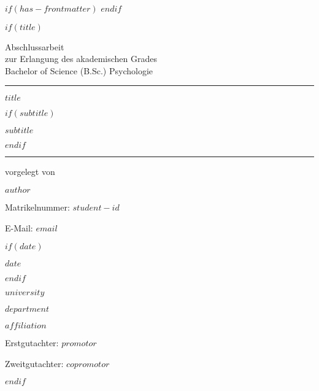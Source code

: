 $if(has-frontmatter)$
\frontmatter
$endif$

$if(title)$
\thispagestyle{empty}
{\centering
Abschlussarbeit \\
zur Erlangung des akademischen Grades \\
Bachelor of Science (B.Sc.) Psychologie \\
\vspace*{10mm}
\hrule
\vspace*{15mm}
{\large\bfseries $title$ \par}
$if(subtitle)$
{\large\bfseries $subtitle$ \par}
$endif$

\vspace*{15mm}
\hrule
\vspace*{10mm}
vorgelegt von  \\ 
{\large\bfseries $author$ \par}
\smallskip
{Matrikelnummer: $student-id$ \par}
{E-Mail: $email$ \par}

\bigskip 

$if(date)$
{\textmd\large $date$ \par}
$endif$

{\textmd\large $university$ \par}
{\textmd\large $department$ \par}
{\textmd\large $affiliation$ \par}

\bigskip\bigskip\bigskip

{Erstgutachter: $promotor$ \par}
{Zweitgutachter: $copromotor$ \par}

\vspace*{10mm}

}
$endif$